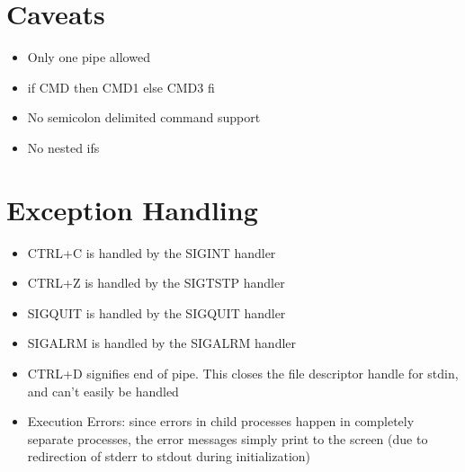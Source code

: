 \documentclass{article}
\begin{document}
\section{Caveats}
\begin{itemize}
\item Only one pipe allowed
\item if CMD then CMD1 else CMD3 fi
\item No semicolon delimited command support 
\item No nested ifs
\end{itemize}
\section{Exception Handling}
\begin{itemize}
\item CTRL+C is handled by the SIGINT handler
\item CTRL+Z is handled by the SIGTSTP handler
\item SIGQUIT is handled by the SIGQUIT handler
\item SIGALRM is handled by the SIGALRM handler
\item CTRL+D signifies end of pipe. This closes the file descriptor handle for stdin, and can't easily be handled
\item Execution Errors: since errors in child processes happen in completely separate processes, the error messages simply print to the screen (due to redirection of stderr to stdout during initialization)
\end{itemize}
\end{document}
